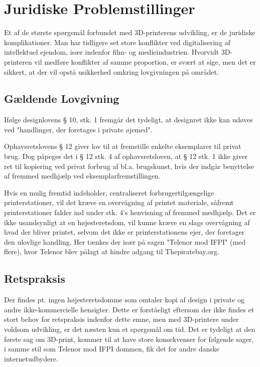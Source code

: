 
\section{Juridiske Problemstillinger}

Et af de største spørgsmål forbundet med 3D-printerens udvikling, er de juridiske komplikationer. Man har tidligere set store konflikter ved digitalisering af intellektuel ejendom, især indenfor film- og medieindustrien. Hvorvidt 3D-printeren vil medføre konflikter af samme proportion, er svært at sige, men det er sikkert, at der vil opstå usikkerhed omkring lovgivningen på området.

\subsection{Gældende Lovgivning}

Ifølge designlovens § 10, stk. 1 fremgår det tydeligt, at designret ikke kan udøves ved "handlinger, der foretages i private øjemed"\autocite{retsinformation.dk_designloven_2012}.

Ophavsretslovens § 12 giver lov til at fremstille enkelte eksemplarer til privat brug.
Dog påpeges det i § 12 stk. 4 af ophavsretsloven\autocite{retsinformation.dk_ophavsretsloven_2010}, at § 12 stk. 1 ikke giver ret til kopiering ved privat forbrug af bl.a. brugskunst, hvis der indgår benyttelse af fremmed medhjælp ved eksemplarfremstillingen.


Hvis en mulig fremtid indeholder, centraliseret forbrugertilgængelige printerstationer\autocite{bjorn_godske_dansk_2012}, vil det kræve en overvågning af printet materiale, såfremt printerstationer falder ind under stk. 4's henvisning af fremmed medhjælp. Det er ikke usandsynligt at en højesteretsdom, vil kunne kræve en slags overvågning af hvad der bliver printet, selvom det ikke er printerstationens ejer, der foretager den ulovlige handling. Her tænkes der især på sagen "Telenor mod IFPI" (med flere)\autocite{domstol.dk_telenor_2010}, hvor Telenor blev pålagt at hindre adgang til Thepiratebay.org.

\subsection{Retspraksis}

Der findes pt. ingen højesteretsdomme som omtaler kopi af design i private og andre ikke-kommercielle hensigter\autocite{domstol.dk_domme_????}. Dette er forståeligt eftersom der ikke findes et stort behov for retspraksis indenfor dette emne, men med 3D-printere under voldsom udvikling, er det næsten kun et spørgsmål om tid. Det er tydeligt at den første sag om 3D-print, kommer til at have store konsekvenser for følgende sager, i samme stil som Telenor mod IFPI dommen, fik det for andre danske internetudbydere\autocite{casper_ulsoe_pirate_2010}.

